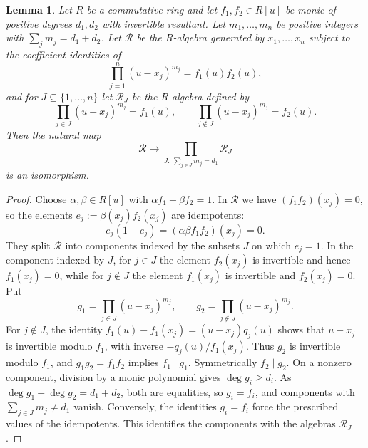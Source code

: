 \documentclass[11pt]{amsart}
\numberwithin{equation}{section}
\newtheorem{lemma}[theorem]{Lemma}
\theoremstyle{definition}
\theoremstyle{remark}
\begin{document}
\begin{lemma}\label{lem:split}
Let $R$ be a commutative ring and let $f_1,f_2\in R[u]$ be monic of positive degrees $d_1,d_2$ with invertible resultant. Let $m_1,\dots,m_n$ be positive integers with $\sum_jm_j=d_1+d_2$. Let $\mathcal R$ be the $R$-algebra generated by $x_1,\dots,x_n$ subject to the coefficient identities of
\begin{equation}\label{eq:split-identity}
\prod_{j=1}^n(u-x_j)^{m_j}=f_1(u)f_2(u),
\end{equation}
and for $J\subseteq\{1,\dots,n\}$ let $\mathcal R_J$ be the $R$-algebra defined by
\begin{equation}\label{eq:split-RJ}
\prod_{j\in J}(u-x_j)^{m_j}=f_1(u),\qquad\prod_{j\notin J}(u-x_j)^{m_j}=f_2(u).
\end{equation}
Then the natural map
\begin{equation}\label{eq:split-iso}
\mathcal R\longrightarrow\prod_{J:\ \sum_{j\in J}m_j=d_1}\mathcal R_J
\end{equation}
is an isomorphism.
\end{lemma}

\begin{proof}
Choose $\alpha,\beta\in R[u]$ with $\alpha f_1+\beta f_2=1$. In $\mathcal R$ we have $(f_1f_2)(x_j)=0$, so the elements $e_j:=\beta(x_j)f_2(x_j)$ are idempotents:
\begin{equation}\label{eq:idempotent}
e_j(1-e_j)=(\alpha\beta f_1f_2)(x_j)=0 .
\end{equation} They split $\mathcal R$ into components indexed by the subsets $J$ on which $e_j=1$. In the component indexed by $J$, for $j\in J$ the element $f_2(x_j)$ is invertible and hence $f_1(x_j)=0$, while for $j\notin J$ the element $f_1(x_j)$ is invertible and $f_2(x_j)=0$. Put
\begin{equation}\label{eq:g12}
g_1=\prod_{j\in J}(u-x_j)^{m_j},\qquad g_2=\prod_{j\notin J}(u-x_j)^{m_j}.
\end{equation} For $j\notin J$, the identity $f_1(u)-f_1(x_j)=(u-x_j)q_j(u)$ shows that $u-x_j$ is invertible modulo $f_1$, with inverse $-q_j(u)/f_1(x_j)$. Thus $g_2$ is invertible modulo $f_1$, and $g_1g_2=f_1f_2$ implies $f_1\mid g_1$. Symmetrically $f_2\mid g_2$. On a nonzero component, division by a monic polynomial gives $\deg g_i\ge d_i$. As $\deg g_1+\deg g_2=d_1+d_2$, both are equalities, so $g_i=f_i$, and components with $\sum_{j\in J}m_j\ne d_1$ vanish. Conversely, the identities $g_i=f_i$ force the prescribed values of the idempotents. This identifies the components with the algebras $\mathcal R_J$.
\end{proof}
\end{document}
